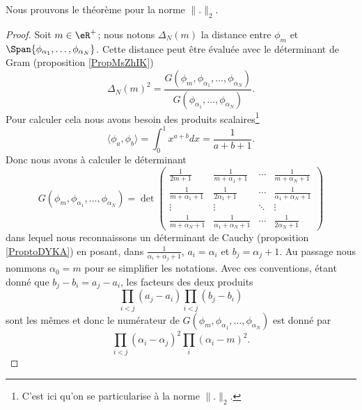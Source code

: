 Nous prouvons le théorème pour la norme \( \| . \|_2\).
\begin{proof}
    Soit \( m\in \eR^+\); nous notons \( \Delta_N(m)\) la distance entre \( \phi_m\) et \( \Span\{ \phi_{\alpha_1},\ldots, \phi_{\alpha_N} \}\). Cette distance peut être évaluée avec le déterminant de Gram (proposition \ref{PropMsZhIK})
    \begin{equation}
        \Delta_N(m)^2=\frac{ G(\phi_m,\phi_{\alpha_1},\ldots, \phi_{\alpha_N}) }{ G(\phi_{\alpha_1},\ldots, \phi_{\alpha_N}) }.
    \end{equation}
    Pour calculer cela nous avons besoin des produits scalaires\footnote{C'est ici qu'on se particularise à la norme \( \| . \|_2\).}
    \begin{equation}
        \langle \phi_a, \phi_b\rangle =\int_0^1 x^{a+b}dx=\frac{1}{ a+b+1 }.
    \end{equation}
    Donc nous avons à calculer le déterminant
    \begin{equation}
        G(\phi_m,\phi_{\alpha_1},\ldots, \phi_{\alpha_N})=\det\begin{pmatrix}
            \frac{1}{ 2m+1 }   &   \frac{1}{ m+\alpha_1+1 }    &   \cdots    &   \frac{1}{ m+\alpha_N+1 }    \\
            \frac{1}{ m+\alpha_1+1 }   &   \frac{1}{ 2\alpha_1+1 }    &   \cdots    &   \frac{1}{ \alpha_1+\alpha_N+1 }    \\
             \vdots   &   \vdots    &   \ddots    &   \vdots    \\ 
             \frac{1}{ m+\alpha_N+1 }   &   \frac{1}{ \alpha_1+\alpha_N+1 }    &   \cdots    &   \frac{1}{ 2\alpha_N+1 }     
         \end{pmatrix}
    \end{equation}
    dans lequel nous reconnaissons un déterminant de Cauchy (proposition \ref{ProptoDYKA}) en posant, dans \( \frac{1}{ \alpha_i+\alpha_j+1 }\), \( a_i=\alpha_i\) et \( b_j=\alpha_j+1\). Au passage nous nommons \( \alpha_0=m\) pour se simplifier les notations. Avec ces conventions, étant donné que \( b_j-b_i=a_j-a_i\), les facteurs des deux produits
    \begin{equation}
        \prod_{i<j}(a_j-a_i)\prod_{i<j}(b_j-b_i)
    \end{equation}
    sont les mêmes et donc le numérateur de \( G(\phi_m,\phi_{\alpha_1},\ldots, \phi_{\alpha_N})\) est donné par
    \begin{equation}
        \prod_{i<j}(\alpha_i-\alpha_j)^2\prod_i(\alpha_i-m)^2.

\end{equation}
\end{proof}
